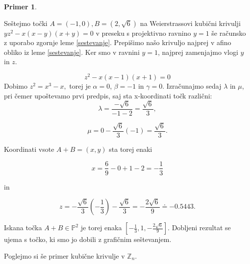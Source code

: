 \documentclass[12pt,a4paper,twoside]{article}
\theoremstyle{definition} %
\newtheorem{primer}[definicija]{Primer}
\theoremstyle{plain} %
\numberwithin{equation}{section}  %
\newcommand{\Z}{\mathbb Z}
\newcommand{\PP}{\mathbb P}
\begin{document}
\begin{primer}~

Seštejmo točki $A =(-1,0),B=(2,\sqrt{6}) $ na Weierstrassovi kubični krivulji $yz^2-x(x-y)(x+y)=0$ v preseku s projektivno ravnino $y=1$ še računsko z uporabo zgornje leme \ref{sestevanje}.
Prepišimo našo krivuljo najprej v afino obliko iz leme \ref{sestevanje}. Ker smo v ravnini $y=1$, najprej zamenjajmo vlogi $y$ in $z$.

$$z^2-x(x-1)(x+1) = 0 $$ 
Dobimo $z^2 = x^3-x,$
torej je $\alpha = 0$, $\beta = -1$ in $\gamma=0$. Izračunajmo sedaj $\lambda$ in $\mu$, pri čemer upoštevamo prvi predpis, saj sta x-koordinati točk različni:
$$\lambda = \frac{-\sqrt{6}}{-1-2} = \frac{\sqrt{6}}{3},$$

$$\mu = 0 - \frac{\sqrt{6}}{3} (-1) = \frac{\sqrt{6}}{3}.$$

Koordinati vsote $A+B=(x,y)$ sta torej enaki

$$x = \frac{6}{9} - 0+1-2=-\frac{1}{3}$$

in

$$z = -\frac{\sqrt{6}}{3}(-\frac{1}{3})-\frac{\sqrt{6}}{3}=-\frac{2\sqrt{6}}{9} \doteq -0.5443.$$

Iskana točka $A+B \in \PP^2$ je torej enaka $[-\frac{1}{3},1,-\frac{2\sqrt{6}}{9}]$. Dobljeni rezultat se ujema s točko, ki smo jo dobili z grafičnim seštevanjem.

\end{primer}


Poglejmo si še primer kubične krivulje v $\Z_n$.
\end{document}
